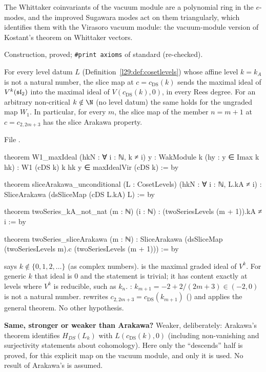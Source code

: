 \begin{physics}
The Whittaker coinvariants of the vacuum module are a polynomial ring in the $e$-modes, and the improved Sugawara
modes act on them triangularly, which identifies them with the Virasoro vacuum module: the vacuum-module version of
Kostant's theorem on Whittaker vectors.
\end{physics}

\begin{status}
Construction, proved; \texttt{\#print axioms} of  standard (re-checked).
\end{status}

\begin{theorem}\label{l29:thm:slicearakawa}
For every level datum $L$ (Definition~\ref{l29:def:cosetlevels}) whose affine level $k=k_A$ is not a natural number, the slice map
at $c=c_{\mathrm{DS}}(k)$ sends the maximal ideal of $V^k(\mathfrak{sl}_2)$ into the maximal ideal of $V(c_{\mathrm{DS}}(k),0)$, in every
Rees degree. For an arbitrary non-critical $k\notin\N$ (no level datum) the same holds for the ungraded map $W_1$. In particular, for every $m$, the slice map of
the member $n=m+1$ at $c=c_{2,2m+3}$ has the slice Arakawa property.
\end{theorem}

\noindent File .
\begin{leancode}
theorem W1_maxIdeal (hkN : ∀ i : ℕ, k ≠ i) {y : WakModule k} (hy : y ∈ Imax k hk) :
    W1 (cDS k) k hk y ∈ maxIdealVir (cDS k) := by

theorem sliceArakawa_unconditional (L : CosetLevels) (hkN : ∀ i : ℕ, L.kA ≠ i) :
    SliceArakawa (dsSliceMap (cDS L.kA) L) := by

theorem twoSeries_kA_not_nat (m : ℕ) (i : ℕ) : (twoSeriesLevels (m + 1)).kA ≠ i := by

theorem twoSeries_sliceArakawa (m : ℕ) :
    SliceArakawa (dsSliceMap (twoSeriesLevels m).c (twoSeriesLevels (m + 1))) := by
\end{leancode}

\begin{dictionary}
 says $k\notin\{0,1,2,\dots\}$ (as complex numbers).  is the maximal graded
ideal of $V^k$. For generic $k$ that ideal is $0$ and the statement is trivial; it has content exactly at levels where
$V^k$ is reducible, such as $k_n$. : $k_{m+1}=-2+2/(2m+3)\in(-2,0)$ is not a natural number.
 rewrites $c_{2,2m+3}=c_{\mathrm{DS}}(k_{m+1})$ () and applies the
general theorem. No other hypothesis.

\textbf{Same, stronger or weaker than Arakawa?} Weaker, deliberately: Arakawa's theorem identifies $H_{DS}(L_k)$ with
$L(c_{\mathrm{DS}}(k),0)$ (including non-vanishing and surjectivity statements about cohomology). Here only the
``descends'' half is proved, for this explicit map on the vacuum module, and only it is used. No result of Arakawa's is
assumed.
\end{dictionary}

